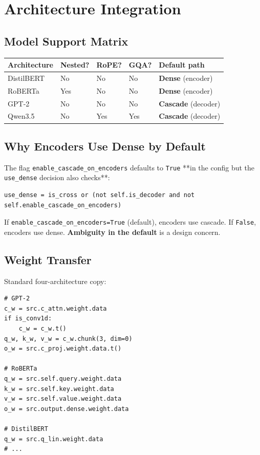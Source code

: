 
\section{Architecture Integration}

\subsection{Model Support Matrix}

\begin{table}[H]
\centering
\small
\begin{tabular}{lllll}
\toprule
\textbf{Architecture} & \textbf{Nested?} & \textbf{RoPE?} & \textbf{GQA?} & \textbf{Default path} \\
\midrule
DistilBERT & No & No & No & \textbf{Dense} (encoder) \\
RoBERTa & Yes & No & No & \textbf{Dense} (encoder) \\
GPT-2 & No & No & No & \textbf{Cascade} (decoder) \\
Qwen3.5 & No & Yes & Yes & \textbf{Cascade} (decoder) \\
\bottomrule
\end{tabular}
\end{table}

\subsection{Why Encoders Use Dense by Default}

The flag \texttt{enable\_cascade\_on\_encoders} defaults to \texttt{True} **in the config 
but the \texttt{use\_dense} decision also checks**:

\begin{lstlisting}
use_dense = is_cross or (not self.is_decoder and not self.enable_cascade_on_encoders)
\end{lstlisting}

If \texttt{enable\_cascade\_on\_encoders=True} (default), encoders use cascade. If 
\texttt{False}, encoders use dense. \textbf{Ambiguity in the default} is a design 
concern.

\subsection{Weight Transfer}

Standard four-architecture copy:

\begin{lstlisting}
# GPT-2
c_w = src.c_attn.weight.data
if is_conv1d:
    c_w = c_w.t()
q_w, k_w, v_w = c_w.chunk(3, dim=0)
o_w = src.c_proj.weight.data.t()

# RoBERTa
q_w = src.self.query.weight.data
k_w = src.self.key.weight.data
v_w = src.self.value.weight.data
o_w = src.output.dense.weight.data

# DistilBERT
q_w = src.q_lin.weight.data
# ...
\end{lstlisting}


